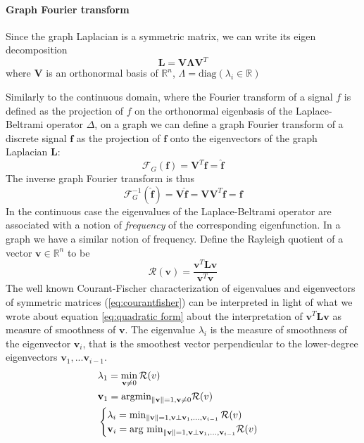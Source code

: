 \paragraph{Graph Fourier transform}
Since the graph Laplacian is a symmetric matrix, we can write its eigen decomposition
$$
\mathbf L = \mathbf V\mathbf \Lambda\mathbf V^T
$$
 where $\mathbf V$ is an orthonormal basis of $\mathbb R^n$, $\Lambda = \text{diag}(\lambda_i\in \mathbb R)$

Similarly to the continuous domain, where the Fourier transform of a signal $f$ is defined as the projection of $f$ on the orthonormal eigenbasis of the Laplace-Beltrami operator $\Delta$, on a graph we can define a graph Fourier transform of a discrete signal $\mathbf f$ as the projection of $\mathbf f$ onto the eigenvectors of the graph Laplacian $\mathbf L$:
\begin{equation}\label{eq:graph fourier}
\mathcal F_G(\mathbf f) = \mathbf V^T\mathbf f = \hat{\mathbf f}
\end{equation}
The inverse graph Fourier transform is thus 
\begin{equation}\label{eq:graph fourier inverse}
\mathcal F^{-1}_G(\hat{\mathbf f}) = \mathbf V \hat{\mathbf f} = \mathbf V\mathbf V^T\mathbf f = {\mathbf f}
\end{equation}
In the continuous case the eigenvalues of the Laplace-Beltrami operator are associated with a notion of \textit{frequency} of the corresponding eigenfunction. In a graph we have a similar notion of frequency. Define the Rayleigh quotient of a vector $\mathbf v \in \mathbb R^n$ to be
\begin{equation}\label{eq:Rayleigh}
	\mathcal R(\mathbf v) = \frac{\mathbf v^T\mathbf L \mathbf v}{\mathbf v^T\mathbf v}
\end{equation}
The well known \cite{Strang} Courant-Fischer characterization of eigenvalues and eigenvectors of symmetric matrices (\ref{eq:courantfisher}) can be interpreted in light of what we wrote about equation \ref{eq:quadratic form} about the interpretation of $\mathbf v^T \mathbf L \mathbf v$ as measure of smoothness of $\mathbf v$. The eigenvalue $\lambda_i$ is the measure of smoothness of the eigenvector $\mathbf v_i$, that is the smoothest vector perpendicular to the lower-degree eigenvectors $\mathbf v_1, ... \mathbf v_{i-1}$.
\begin{equation}\label{eq:courantfisher}
	\begin{aligned} 
	&\lambda_1 = \min_{\mathbf v\neq 0} \mathcal R(v)\\
	&\mathbf v_1 = \text{argmin}_{\left\lVert\mathbf v\right\rVert = 1, \mathbf v\neq 0} \mathcal R(v)\\
	&\begin{cases}
	\lambda_i = \min_{\left\lVert\mathbf v\right\rVert = 1, \mathbf v\perp \mathbf v_1, ..., \mathbf v_{i-1}} \mathcal R(v)\\
	\mathbf v_i = \text{arg min}_{\left\lVert\mathbf v\right\rVert = 1, \mathbf v\perp \mathbf v_1, ..., \mathbf v_{i-1}}  \mathcal R(v)
	\end{cases}
	\end{aligned}	
\end{equation}
